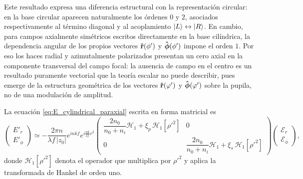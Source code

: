 Este resultado expresa una diferencia estructural con la representación circular: en la base circular aparecen naturalmente los órdenes \(0\) y \(2\), asociados respectivamente al término diagonal y al acoplamiento \(\ket L\leftrightarrow\ket R\). En cambio, para campos axialmente simétricos escritos directamente en la base cilíndrica, la dependencia angular de los propios vectores \(\bm{\hat{\mathbf{r}}}(\phi')\) y \(\bm{\hat{\mathbf{\phi}}}(\phi')\) impone el orden \(1\). Por eso los haces radial y azimutalmente polarizados presentan un cero axial en la componente transversal del campo focal: la ausencia de campo en el centro es un resultado puramente vectorial que la teoría escalar no puede describir, pues emerge de la estructura geométrica de los vectores $\bm{\hat{\mathbf{r}}}(\varphi')$ y $\bm{\hat{\mathbf{\phi}}}(\varphi')$ sobre la pupila, no de una modulación de amplitud.

La ecuación \eqref{eq:E_cylindrical_paraxial} escrita en forma matricial es
\begin{equation}
\begin{pmatrix}
E'_r\\
E'_\phi
\end{pmatrix}
\simeq
-\frac{2\pi n}{\lambda f\,|z_0|}
e^{inkf}
e^{i\frac{nk}{2f}r^2}
\begin{pmatrix}
\dfrac{2n_0}{n_0+n_i}\mathscr H_1+\xi_p\,\mathscr H_1[\rho'^2]
&
0
\\[0.8em]
0
&
\dfrac{2n_0}{n_0+n_i}\mathscr H_1+\xi_s\,\mathscr H_1[\rho'^2]
\end{pmatrix}
\begin{pmatrix}
\mathscr E_r\\
\mathscr E_\phi
\end{pmatrix},
\label{eq:E_cylindrical_paraxial_matrix}
\end{equation}
donde $\mathscr H_1[\rho'^2]$ denota el operador que multiplica por $\rho'^2$ y aplica la transformada de Hankel de orden uno.


